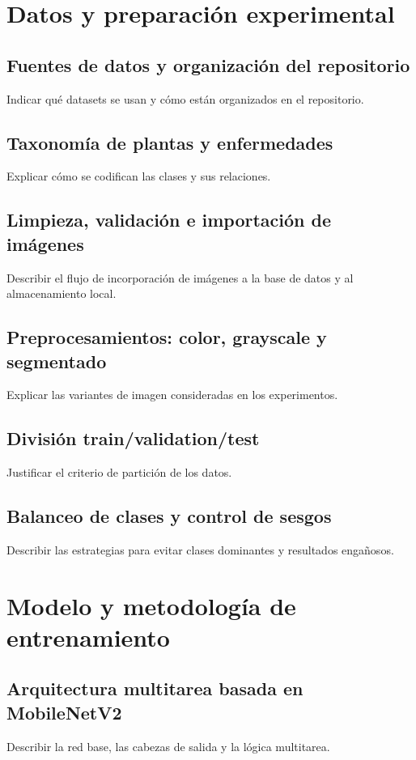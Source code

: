 \documentclass[11pt,spanish,listoffigures,listoftables]{tfgetsinf}
\begin{document}
\chapter{Datos y preparación experimental}
\section{Fuentes de datos y organización del repositorio}
Indicar qué datasets se usan y cómo están organizados en el repositorio.

\section{Taxonomía de plantas y enfermedades}
Explicar cómo se codifican las clases y sus relaciones.

\section{Limpieza, validación e importación de imágenes}
Describir el flujo de incorporación de imágenes a la base de datos y al almacenamiento local.

\section{Preprocesamientos: color, grayscale y segmentado}
Explicar las variantes de imagen consideradas en los experimentos.

\section{División train/validation/test}
Justificar el criterio de partición de los datos.

\section{Balanceo de clases y control de sesgos}
Describir las estrategias para evitar clases dominantes y resultados engañosos.

\chapter{Modelo y metodología de entrenamiento}
\section{Arquitectura multitarea basada en MobileNetV2}
Describir la red base, las cabezas de salida y la lógica multitarea.
\end{document}
